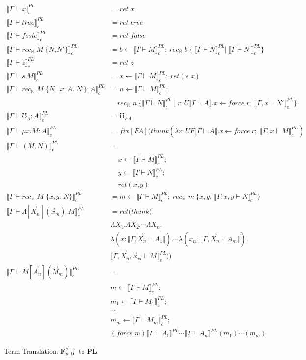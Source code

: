 \documentclass[acmsmall]{acmart}
\newcommand{\den}[1]{\llbracket #1\rrbracket}
\newcommand{\source}{$\mathbf{F}_{\mu,\mho}^{\forall\to}\;$}
\newcommand{\pl}{$\mathbf{PL}$}
\begin{document}
\begin{figure}[!htbp]
  \centering
  \scriptsize
\begin{align*}
  \den{\Gamma \vdash x}^{PL}_c &= ret\;x \\
  \den{\Gamma \vdash true}^{PL}_c &= ret\; true\\
  \den{\Gamma \vdash fasle}^{PL}_c &= ret\; false\\
  \den{\Gamma \vdash rec_{\mathbb{B}}\;M \; \{N,N'\}}^{PL}_c &= b \leftarrow \den{\Gamma \vdash M}^{PL}_c;\; rec_{\mathbb{B}}\; b \; \{\;\den{\Gamma \vdash N}^{PL}_c|\;\den{\Gamma \vdash N'}^{PL}_c\}\\
  \den{\Gamma \vdash z}^{PL}_c &= ret\;z\\
  \den{\Gamma \vdash s \;M}^{PL}_c &= x \leftarrow \den{\Gamma \vdash M}^{PL}_c;\; ret(s \; x)\\
  \den{\Gamma \vdash rec_{\mathbb{N}}\;M \; \{N \;|\; x:A.\; N'\}  : A}^{PL}_c &= n \leftarrow \den{\Gamma \vdash M}^{PL}_c;\\
  &\quad rec_{\mathbb{N}}\;n\; \{\den{\Gamma \vdash N}^{PL}_c \;|\; r: U\den{\Gamma \vdash A}. x \leftarrow force \;r; \; \den{\Gamma,x \vdash N'}^{PL}_c\}\\
  \den{\Gamma \vdash \mho_A : A}^{PL}_c &= \mho_{FA}\\
  \den{\Gamma \vdash \mu x.M : A}^{PL}_c &= fix[FA](thunk(\lambda r : UF\den{\Gamma \vdash A}. x \leftarrow force\;r;\; \den{\Gamma,x \vdash M}^{PL}_c)\\
  \den{\Gamma \vdash (M,N)}^{PL}_c &=\\
  &\;\;\;\; x \leftarrow \den{\Gamma \vdash M}^{PL}_c;\\
  &\;\;\;\; y \leftarrow \den{\Gamma \vdash N}^{PL}_c;\\
  &\;\;\;\; ret (x,y)\\
  \den{\Gamma \vdash rec_\times\;M \;\{x,y.\; N\}}^{PL}_c &= m \leftarrow \den{\Gamma \vdash M}^{PL}_c;\; rec_\times\;m\;\{x,y.\; \den{\Gamma,x,y\vdash N}^{PL}_c\}\\
  \den{\Gamma \vdash \Lambda[\overrightarrow{X}_n](\overrightarrow{x}_m).M}^{PL}_c &= 
  ret(thunk(\\
  &\Lambda X_1.\Lambda X_2.\cdots\Lambda X_n.\\ 
  &\lambda(x:\den{\Gamma,\overrightarrow{X}_n \vdash A_1}).\cdots \lambda(x_m: \den{\Gamma,\overrightarrow{X}_n \vdash A_m}).\\
  &\den{\Gamma ,\overrightarrow{X}_n,\overrightarrow{x}_m\vdash M}^{PL}_c))\\
  \den{\Gamma \vdash M[\overrightarrow{A}_n](\overrightarrow{M}_m)}^{PL}_c &= \\
  &m \leftarrow \den{\Gamma \vdash M}^{PL}_c;\\
  &m_1 \leftarrow \den{\Gamma \vdash M_1}^{PL}_c;\\
  &\cdots\\
  &m_m \leftarrow \den{\Gamma \vdash M_m}^{PL}_c;\\
  &(force \;m)\den{\Gamma \vdash A_1}^{PL}\cdots\den{\Gamma \vdash A_n}^{PL}(m_1)\cdots(m_m)
  \end{align*}
  \caption{Term Translation: \source to \pl}
\end{figure}
\end{document}
